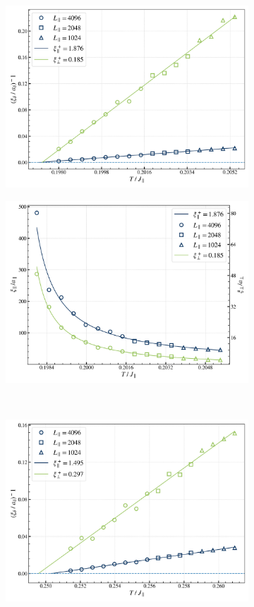 \begin{figure}[htp]
\begin{subfigure}{0.475\textwidth}
			\centering			\includegraphics[width=0.95\linewidth]{graphics/xi-inv-divergence-100-3.png}
		\end{subfigure}
		\begin{subfigure}{0.475\textwidth}
			\centering			\includegraphics[width=0.95\linewidth]{graphics/xi-divergence-100-3.png}
		\end{subfigure} \\ 
		\begin{subfigure}{0.475\textwidth}
			\centering		\includegraphics[width=0.95\linewidth]{graphics/xi-inv-divergence-small-h-4.png}

\end{subfigure}
\end{figure}

